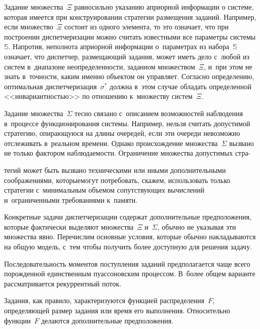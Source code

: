 \begin{multicols}{2}
    Задание множества~$\Xi$ равносильно указанию априорной информации о системе, 
которая имеется при конструировании стратегии размещения заданий. Например, если 
множество~$\Xi$ состоит из одного элемента, то это означает, что при построении 
диспетчеризации можно считать известными все параметры системы~$\mathbb{S}$. 
Напротив, неполнота априорной информации о~параметрах из набора~$\mathbb{S}$ 
означает, что диспетчер, раз\-ме\-ща\-ющий задания, может иметь дело с~любой из систем 
в~диапазоне неопределенности, заданном множеством~$\Xi$, и~при этом не знать 
в~точности, каким именно объектом он управляет. Согласно определению, оптимальная 
диспетчеризация~$\sigma^*$ должна в~этом случае обладать определенной 
<<инвариантностью>> по отношению к~множеству систем~$\Xi$.
    
    Задание множества~$\Sigma$ тесно связано с~описанием возможностей наблюдения 
в~процессе функционирования системы. Например, нельзя считать до\-пус\-ти\-мой 
стратегию, опирающуюся на длины очередей, если эти очереди невозможно отслеживать 
в~реальном времени. Однако происхождение множества~$\Sigma$ вызвано не только 
фактором наблюда\-емости. Ограничение множества допустимых стра-\linebreak\vspace*{-12pt}

\pagebreak

\noindent
тегий может быть 
вызвано техническими или иными дополнительными соображениями, которые\linebreak могут 
потребовать, скажем, использовать только стратегии с~минимальным объемом 
сопутствующих вычислений и~ограниченными требованиями к~памяти.
    
    Конкретные задачи диспетчеризации содержат дополнительные предположения, 
которые фактически выделяют множества~$\Xi$ и~$\Sigma$, обычно не указывая эти 
множества явно. Перечислим основные условия, которые обычно накладываются на 
общую модель, с~тем чтобы получить более доступную для решения задачу.
    
    Последовательность моментов поступления заданий предполагается чаще всего 
порожденной единственным пуассоновским процессом. В~более общем варианте 
рассматривается рекуррентный поток.
    
    Задания, как правило, характеризуются функцией распределения~$F$, определяющей 
размер задания или время его выполнения. Относительно функции~$F$ делаются 
дополнительные предположения.
    

\end{multicols}
